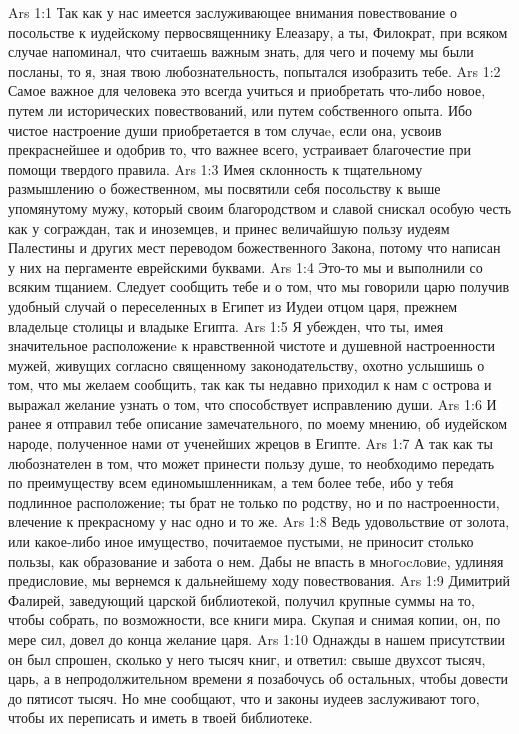 \vs Ars 1:1
Так как у нас имеется заслуживающее внимания повествование о посольстве к иудейскому первосвященнику Елеазару, а ты, Филократ, при всяком случае напоминал, что считаешь важным знать, для чего и почему мы были посланы, то я, зная твою любознательность, попытался изобразить тебе.
\vs Ars 1:2
Самое важное для человека это всегда учиться и приобретать что-либо новое, путем ли исторических повествований, или путем собственного опыта. Ибо чистое настроение души приобретается в том случаe, если она, усвоив прекраснейшее и одобрив то, что важнее всего, устраивает благочестие при помощи твердого правила.
\vs Ars 1:3
Имея склонность к тщательному размышлению о божественном, мы посвятили себя посольству к выше упомянутому мужу, который своим благородством и славой снискал особую честь как у сограждан, так и иноземцев, и принес величайшую пользу иудеям Палестины и других мест переводом божественного Закона, потому что написан у них на пергаменте еврейскими буквами.
\vs Ars 1:4
Это-то мы и выполнили со всяким тщанием. Следует сообщить тебе и о том, что мы говорили царю получив удобный случай о переселенных в Египет из Иудеи отцом царя, прежнем владельце столицы и владыке Египта.
\vs Ars 1:5
Я убежден, что ты, имея значительное расположениe к нравственной чистоте и душевной настроенности мужей, живущих согласно священному законодательству, охотно услышишь о том, что мы желаем сообщить, так как ты недавно приходил к нам с острова и выражал желание узнать о том, что способствует исправлению души.
\vs Ars 1:6
И ранее я отправил тебе описание замечательного, по моему мнению, об иудейском народе, полученное нами от ученейших жрецов в Египте.
\vs Ars 1:7
А так как ты любознателен в том, что может принести пользу душе, то необходимо передать по преимуществу всем единомышленникам, а тем более тебе, ибо у тебя подлинное расположение; ты брат не только по родству, но и по настроенности, влечение к прекрасному у нас одно и то же.
\vs Ars 1:8
Ведь удовольствие от золота, или какое-либо иное имущество, почитаемое пустыми, не приносит столько пользы, как образование и забота о нем. Дабы не впасть в мнoгocлoвиe, удлиняя предисловие, мы вернемся к дальнейшему ходу повествования.
\vs Ars 1:9
Димитрий Фалирей, заведующий царской библиотекой, получил крупные суммы на то, чтобы собрать, по возможности, все книги мира. Скупая и снимая копии, он, по мере сил, довел до конца желание царя.
\vs Ars 1:10
Однажды в нашем присутствии он был спрошен, сколько у него тысяч книг, и ответил: свыше двухсот тысяч, царь, а в непродолжительном времени я позабочусь об остальных, чтобы довести до пятисот тысяч. Но мне сообщают, что и законы иудеев заслуживают того, чтобы их переписать и иметь в твоей библиотеке.
